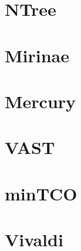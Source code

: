 \section{NTree}

\section{Mirinae}
\cite{citeulike:1033029}

\section{Mercury}
\cite{citeulike:854573}

\section{VAST}
\cite{citeulike:4243573}

\section{minTCO}
\cite{citeulike:4069017}

\section{Vivaldi}
\cite{citeulike:162250}
